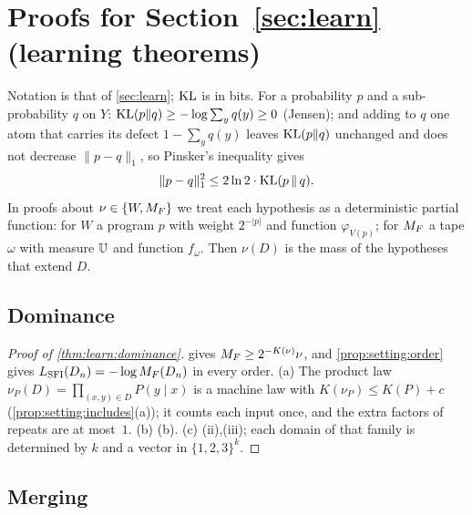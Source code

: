 \section{Proofs for Section~\ref{sec:learn} (learning theorems)}\label{app:learn}

Notation is that of \cref{sec:learn}; $\operatorname{KL}$ is in bits. For a probability $p$ and a sub-probability $q$ on $Y$: $\operatorname{KL}(p\|q)\ge-\log\sum_yq(y)\ge0$ (Jensen); and adding to $q$ one atom that carries its defect $1-\sum_yq(y)$ leaves $\operatorname{KL}(p\|q)$ unchanged and does not decrease $\|p-q\|_1$, so Pinsker's inequality gives
\begin{equation}\label{eq:learn:pinsker}
\|p-q\|_1^2\le2\ln2\cdot\operatorname{KL}(p\,\|\,q).
\end{equation}
In proofs about $\nu\in\{W,M_{F}\}$ we treat each hypothesis as a deterministic partial function: for $W$ a program $p$ with weight $2^{-|p|}$ and function $\varphi_{V(p)}$; for $M_{F}$ a tape $\omega$ with measure $\mathbb{U}$ and function $f_\omega$. Then $\nu(D)$ is the mass of the hypotheses that extend $D$.

\subsection{Dominance}\label{app:learn:dominance}

\begin{proof}[Proof of \cref{thm:learn:dominance}]
 gives $M_{F}\ge2^{-K(\nu)}\nu$, and \cref{prop:setting:order} gives $L_{\mathrm{SFI}}(D_n)=-\log M_{F}(D_n)$ in every order. (a) The product law $\nu_P(D)=\prod_{(x,y)\in D}P(y\mid x)$ is a machine law with $K(\nu_P)\le K(P)+c$ (\cref{prop:setting:includes}(a)); it counts each input once, and the extra factors of repeats are at most~$1$. (b) (b). (c) (ii),(iii); each domain of that family is determined by $k$ and a vector in $\{1,2,3\}^k$.
\end{proof}

\subsection{Merging}\label{app:learn:merging}

